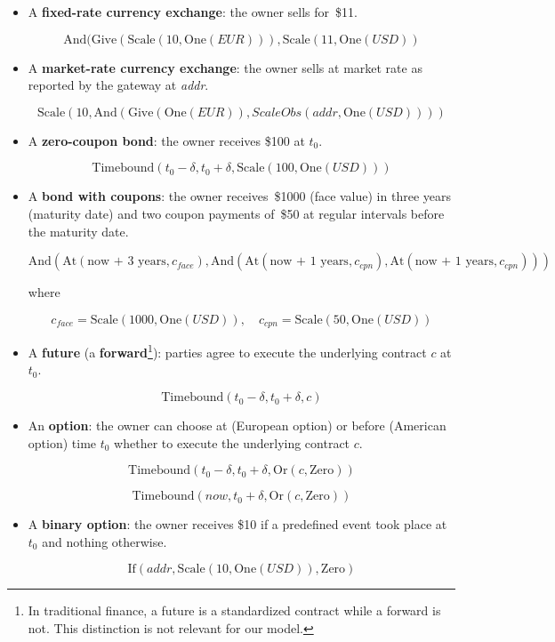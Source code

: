 \begin{itemize}
	\item A \textbf{fixed-rate currency exchange}: the owner sells  for~\$11.
	
	\[\mathrm{And}(\mathrm{Give}(\mathrm{Scale}(10, \mathrm{One}(EUR))),\mathrm{Scale}(11,\mathrm{One}(USD))\]
	
	
	\item A \textbf{market-rate currency exchange}: the owner sells  at market rate as reported by the gateway at \textit{addr}.
	
	\[\mathrm{Scale}(10, \mathrm{And}(\mathrm{Give}(\mathrm{One}(EUR)), ScaleObs(addr,\mathrm{One}(USD))))\]
	
	
	\item A \textbf{zero-coupon bond}: the owner receives \$100 at \(t_0\).
	
	\[\mathrm{Timebound}(t_0-\delta, t_0+\delta, \mathrm{Scale}(100, \mathrm{One}(USD)))\]
	
	
	\item A \textbf{bond with coupons}: the owner receives~\$1000 (face value) in three years (maturity date) and two coupon payments of~\$50 at regular intervals before the maturity date.
	
	\[\mathrm{And}(\mathrm{At}(\text{now + 3 years},c_{face}),\mathrm{And}(\mathrm{At}(\text{now + 1 years}, c_{cpn}),\mathrm{At}(\text{now + 1 years},c_{cpn})))\]
	
	where
	
	\[c_{face} = \mathrm{Scale}(1000,\mathrm{One}(USD)), \quad c_{cpn} = \mathrm{Scale}(50,\mathrm{One}(USD))\]
	
	
	\item A \textbf{future} (a \textbf{forward}\footnote{In traditional finance, a future is a standardized contract while a forward is not. This distinction is not relevant for our model.}): parties agree to execute the underlying contract \(c\) at \(t_0\).
	
	\[\mathrm{Timebound}(t_0-\delta, t_0+\delta, c)\]
	
	
	\item An \textbf{option}: the owner can choose at (European option) or before (American option) time \(t_0\) whether to execute the underlying contract \(c\).
	
	\[\mathrm{Timebound}(t_0-\delta, t_0+\delta, \mathrm{Or}(c, \mathrm{Zero}))\]
	
	\[\mathrm{Timebound}(now, t_0+\delta, \mathrm{Or}(c, \mathrm{Zero}))\]
	
	
	\item A \textbf{binary option}: the owner receives \$10 if a predefined event took place at \(t_0\) and nothing otherwise.
	
	\[\mathrm{If}(addr, \mathrm{Scale}(10, \mathrm{One}(USD)), \mathrm{Zero})\]
	
\end{itemize}
